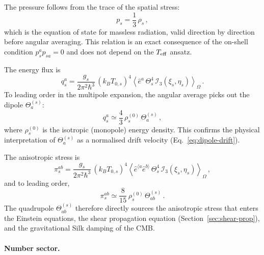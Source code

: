 The pressure follows from the trace of the spatial
stress:
\begin{equation}\label{eq:p-s-recon}
p_s = \frac{1}{3}\,\rho_s\,,
\end{equation}
which is the equation of state for massless
radiation, valid direction by direction before angular
averaging.  This relation is an exact consequence of the
on-shell condition $p_s^a p_{sa} = 0$ and does not
depend on the $T_{\mathrm{eff}}$ ansatz.

The energy flux is
\begin{equation}\label{eq:q-s-recon}
q_s^a
= \frac{g_s}{2\pi^2\hbar^3}\,(k_B T_{0,s})^4
  \left\langle \hat{e}^a\,\Theta_s^4\,
  \mathcal{I}_3(\xi_s, \eta_s)
  \right\rangle_\Omega\,.
\end{equation}
To leading order in the multipole expansion, the
angular average picks out the dipole
$\Theta^{(s)}_a$:
\begin{equation}\label{eq:q-leading}
q_s^a
\simeq \frac{4}{3}\,\rho_s^{(0)}\,
  \Theta^{(s)}_a\,,
\end{equation}
where $\rho_s^{(0)}$ is the isotropic (monopole)
energy density.  This confirms the physical
interpretation of $\Theta^{(s)}_a$ as a normalised
drift velocity (Eq.~\ref{eq:dipole-drift}).

The anisotropic stress is
\begin{equation}\label{eq:pi-s-recon}
\pi_s^{ab}
= \frac{g_s}{2\pi^2\hbar^3}\,(k_B T_{0,s})^4
  \left\langle \hat{e}^{\langle a}\hat{e}^{b\rangle}\,
  \Theta_s^4\, \mathcal{I}_3(\xi_s, \eta_s)
  \right\rangle_\Omega\,,
\end{equation}
and to leading order,
\begin{equation}\label{eq:pi-leading}
\pi_s^{ab}
\simeq \frac{8}{15}\,\rho_s^{(0)}\,
  \Theta^{(s)}_{ab}\,.
\end{equation}
The quadrupole $\Theta^{(s)}_{ab}$ therefore directly
sources the anisotropic stress that enters the
Einstein equations, the shear propagation equation
(Section~\ref{sec:shear-prop}), and the gravitational
Silk damping of the CMB.


\paragraph{Number sector.}

